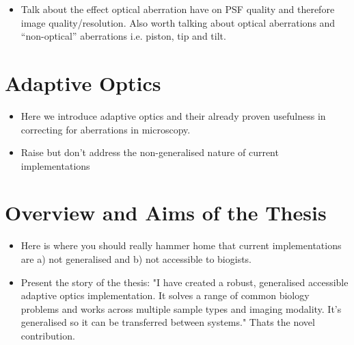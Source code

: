 \begin{itemize}
	\item Talk about the effect optical aberration have on PSF quality and therefore image quality/resolution. Also worth talking about optical aberrations and ``non-optical'' aberrations i.e. piston, tip and tilt.
\end{itemize}

\section{Adaptive Optics}
\label{sec:AO}

\begin{itemize}
	\item Here we introduce adaptive optics and their already proven usefulness in correcting for aberrations in microscopy.
	\item Raise but don't address the non-generalised nature of current implementations
\end{itemize}

\section{Overview and Aims of the Thesis}
\label{sec:overview}

\begin{itemize}
	\item Here is where you should really hammer home that current implementations are a) not generalised and b) not accessible to biogists.
	\item Present the story of the thesis: "I have created a robust, generalised accessible adaptive optics implementation. It solves a range of common biology problems and works across multiple sample types and imaging modality. It's generalised so it can be transferred between systems." Thats the novel contribution.
\end{itemize}

